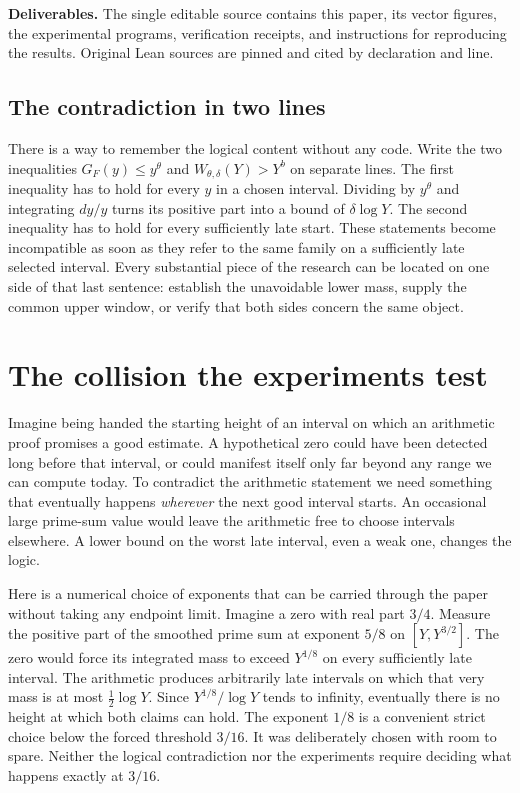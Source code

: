 \documentclass[12pt,letterpaper]{article}
\begin{document}
\medskip\textbf{Deliverables.} The single editable source contains this paper, its vector figures, the experimental programs, verification receipts, and instructions for reproducing the results. Original Lean sources are pinned and cited by declaration and line.
\clearpage\tableofcontents
\bigskip\subsection*{The contradiction in two lines}
There is a way to remember the logical content without any code. Write the two inequalities \(G_F(y)\le y^\theta\) and \(W_{\theta,\delta}(Y)>Y^b\) on separate lines. The first inequality has to hold for every \(y\) in a chosen interval. Dividing by \(y^\theta\) and integrating \(dy/y\) turns its positive part into a bound of \(\delta\log Y\). The second inequality has to hold for every sufficiently late start. These statements become incompatible as soon as they refer to the same family on a sufficiently late selected interval. Every substantial piece of the research can be located on one side of that last sentence: establish the unavoidable lower mass, supply the common upper window, or verify that both sides concern the same object.

\clearpage
\section{The collision the experiments test}
Imagine being handed the starting height of an interval on which an arithmetic proof promises a good estimate. A hypothetical zero could have been detected long before that interval, or could manifest itself only far beyond any range we can compute today. To contradict the arithmetic statement we need something that eventually happens \emph{wherever} the next good interval starts. An occasional large prime-sum value would leave the arithmetic free to choose intervals elsewhere. A lower bound on the worst late interval, even a weak one, changes the logic.

Here is a numerical choice of exponents that can be carried through the paper without taking any endpoint limit. Imagine a zero with real part \(3/4\). Measure the positive part of the smoothed prime sum at exponent \(5/8\) on \([Y,Y^{3/2}]\). The zero would force its integrated mass to exceed \(Y^{1/8}\) on every sufficiently late interval. The arithmetic produces arbitrarily late intervals on which that very mass is at most \(\tfrac12\log Y\). Since \(Y^{1/8}/\log Y\) tends to infinity, eventually there is no height at which both claims can hold. The exponent \(1/8\) is a convenient strict choice below the forced threshold \(3/16\). It was deliberately chosen with room to spare. Neither the logical contradiction nor the experiments require deciding what happens exactly at \(3/16\).
\end{document}

